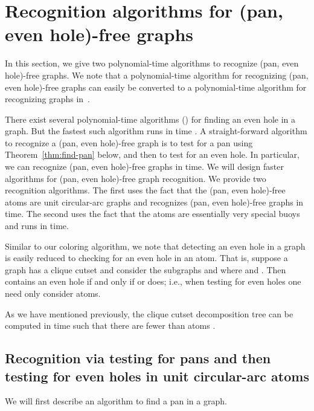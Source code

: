 \documentclass[11pt,a4paper]{article}
\begin{document}
\section{Recognition algorithms for (pan, even hole)-free graphs}
\label{sec:recognition}
In this section, we give two polynomial-time algorithms to recognize
(pan, even hole)-free graphs. We note that a polynomial-time algorithm
for recognizing (pan, even hole)-free graphs can easily be
converted to a polynomial-time algorithm for recognizing graphs in~.

There exist several polynomial-time algorithms (\cite{ChaLu2013,
ChuKaw2005, ConCor2002}) for finding an even hole in a graph. But
the fastest such algorithm \cite{ChaLu2013} runs in time
. A straight-forward algorithm to
recognize a (pan, even hole)-free graph is to test for a pan using
Theorem~\ref{thm:find-pan} below, and then to test for an even
hole. In particular, we can recognize (pan, even hole)-free graphs
in  time. We will design faster algorithms for (pan,
even hole)-free graph recognition. We provide two recognition
algorithms. The first uses the fact that the (pan, even hole)-free
atoms are unit circular-arc graphs and recognizes (pan, even
hole)-free graphs in  time. The
second uses the fact that the atoms are essentially very special
buoys and runs in  time.

Similar to our coloring algorithm, we note that detecting an
even hole in a graph  is easily reduced to checking for an
even hole in an atom. That is, suppose a graph  has a clique
cutset  and consider the subgraphs  and  where  and . Then 
contains an even hole if and only if  or  does; i.e.,
when testing for even holes one need only consider atoms.

As we have mentioned previously, the clique cutset decomposition
tree  can be computed in  time such that there are
fewer than  atoms \cite{Tar1985}.



\subsection{Recognition via testing for pans and then testing for even holes in unit circular-arc atoms}

We will first describe an algorithm to find a pan in
a graph.
\end{document}
